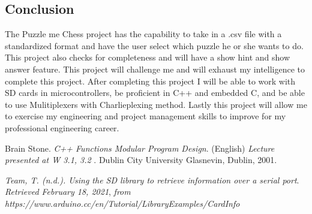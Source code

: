 \documentclass[11pt]{article}
\begin{document}
\subsection{Conclusion}
The Puzzle me Chess project has the capability to take in a .csv file with a standardized format and have the user select which puzzle he or she wants to do. This project also checks for completeness and will have a show hint and show answer feature. This project will challenge me and will exhaust my intelligence to complete this project. After completing this project I will be able to work with SD cards in microcontrollers, be proficient in C++ and embedded C, and be able to use Mulitiplexers with Charlieplexing method. Lastly this project will allow me to exercise my engineering and project management skills to improve for my professional engineering career. 


\begin{thebibliography}{2}
Brain Stone. 
\textit{C++ Functions Modular Program Design}. (English) 
\textit{ Lecture presented at W 3.1, 3.2 }. 
Dublin City University Glasnevin, Dublin, 2001.

\textit{Team, T. (n.d.). Using the SD library to retrieve information over a serial port}.
\textit{ Retrieved February 18, 2021}, 
\textit{from https://www.arduino.cc/en/Tutorial/LibraryExamples/CardInfo}
\end{thebibliography}
\end{document}
